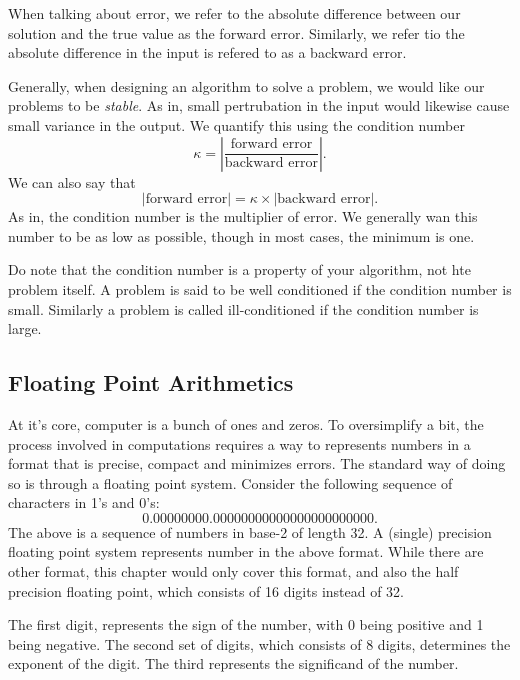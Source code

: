 \documentclass[5pt, a4paper]{article}
\begin{document}
When talking about error, we refer to the absolute difference between our
solution and the true value as the forward error. Similarly, we refer tio the
absolute difference in the input is refered to as a backward error.

Generally, when designing an algorithm to solve a problem, we would like our
problems to be \textit{stable}. As in, small pertrubation in the input would
likewise cause small variance in the output. We quantify this using the
condition number \[
    \kappa = \left| \frac{\text{forward error}}{\text{backward error}}\right|
.\] 
We can also say that \[
| \text{forward error} | = \kappa \times | \text{backward error} |
.\] 
As in, the condition number is the multiplier of error. We generally wan this
number to be as low as possible, though in most cases, the minimum is one. 

Do note that the condition number is a property  of your algorithm, not hte
problem itself. A problem is said to be well conditioned if the condition number
is small. Similarly a problem is called ill-conditioned if the condition number
is large.

\subsection*{Floating Point Arithmetics}

At it's core, computer is a bunch of ones and zeros. To oversimplify a bit, the
process involved in computations requires a way to represents numbers in a
format that is precise, compact and minimizes errors. The standard way of doing
so is through a floating point system. Consider the following sequence of
characters in 1's and 0's: \[
    0.00000000.00000000000000000000000
.\] 
The above is a sequence of numbers in base-2 of length 32. A (single) precision
floating point system represents number in the above format. While there are
other format, this chapter would only cover this format, and also the half
precision floating point, which consists of 16 digits instead of 32.

The first digit, represents the sign of the number, with 0 being positive and 1
being negative. The second set of digits, which consists of 8 digits, determines
the exponent of the digit. The third represents the significand of the number.
\end{document}
